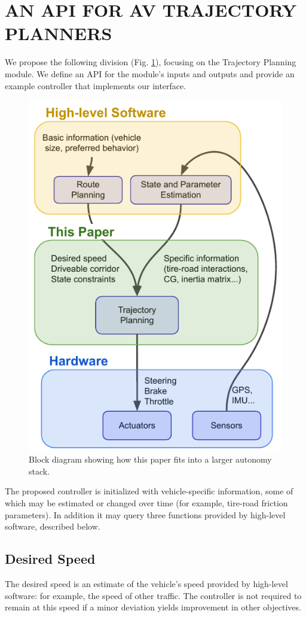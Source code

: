 \documentclass[letterpaper, 10 pt, conference]{ieeeconf}  %
\begin{document}
\section{AN API FOR AV TRAJECTORY PLANNERS}

We propose the following division (Fig. \ref{fig:block}), focusing on the Trajectory Planning module. We define an API for the module's inputs and outputs and provide an example controller that implements our interface.

\begin{figure}[h]
	\centering
	\includegraphics[width=0.75\linewidth]{figures/block_diagram.pdf}
	\caption{Block diagram showing how this paper fits into a larger autonomy stack.}
	\label{fig:block}
\end{figure}

The proposed controller is initialized with vehicle-specific information, some of which may be estimated or changed over time (for example, tire-road friction parameters). In addition it may query three functions provided by high-level software, described below.

\subsection{Desired Speed}
The desired speed is an estimate of the vehicle's speed provided by high-level software: for example, the speed of other traffic. The controller is not required to remain at this speed if a minor deviation yields improvement in other objectives.
\end{document}
